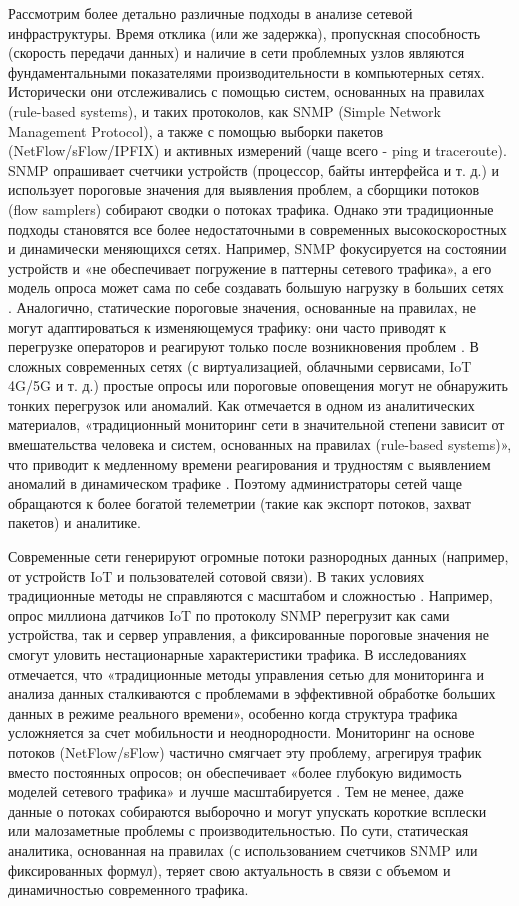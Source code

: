 Рассмотрим более детально различные подходы в анализе сетевой инфраструктуры. Время отклика (или же задержка), пропускная способность (скорость передачи данных) и наличие в сети проблемных узлов являются фундаментальными показателями производительности в компьютерных сетях. Исторически они отслеживались с помощью систем, основанных на правилах (rule-based systems), и таких протоколов, как SNMP (Simple Network Management Protocol), а также с помощью выборки пакетов (NetFlow/sFlow/IPFIX) и активных измерений (чаще всего - ping и traceroute). SNMP опрашивает счетчики устройств (процессор, байты интерфейса и т. д.) и использует пороговые значения для выявления проблем, а сборщики потоков (flow samplers) собирают сводки о потоках трафика. Однако эти традиционные подходы становятся все более недостаточными в современных высокоскоростных и динамически меняющихся сетях. Например, SNMP фокусируется на состоянии устройств и «не обеспечивает погружение в паттерны сетевого трафика», а его модель опроса может сама по себе создавать большую нагрузку в больших сетях \cite{snmp1}. Аналогично, статические пороговые значения, основанные на правилах, не могут адаптироваться к изменяющемуся трафику: они часто приводят к перегрузке операторов и реагируют только после возникновения проблем \cite{mlmon1}. В сложных современных сетях (с виртуализацией, облачными сервисами, IoT 4G/5G и т. д.) простые опросы или пороговые оповещения могут не обнаружить тонких перегрузок или аномалий. Как отмечается в одном из аналитических материалов, «традиционный мониторинг сети в значительной степени зависит от вмешательства человека и систем, основанных на правилах (rule-based systems)», что приводит к медленному времени реагирования и трудностям с выявлением аномалий в динамическом трафике \cite{mlmon1}. Поэтому администраторы сетей  чаще обращаются к более богатой телеметрии (такие как экспорт потоков, захват пакетов) и аналитике.


Современные сети генерируют огромные потоки разнородных данных (например, от устройств IoT и пользователей сотовой связи). В таких условиях традиционные методы не справляются с масштабом и сложностью \cite{Abbasi2021}. Например, опрос миллиона датчиков IoT по протоколу SNMP перегрузит как сами устройства, так и сервер управления, а фиксированные пороговые значения не смогут уловить нестационарные характеристики трафика. В исследованиях отмечается, что «традиционные методы управления сетью для мониторинга и анализа данных сталкиваются с проблемами в эффективной обработке больших данных в режиме реального времени», особенно когда структура трафика усложняется за счет мобильности и неоднородности. Мониторинг на основе потоков (NetFlow/sFlow) частично смягчает эту проблему, агрегируя трафик вместо постоянных опросов; он обеспечивает «более глубокую видимость моделей сетевого трафика» и лучше масштабируется \cite{snmp1}. Тем не менее, даже данные о потоках собираются выборочно и могут упускать короткие всплески или малозаметные проблемы с производительностью. По сути, статическая аналитика, основанная на правилах (с использованием счетчиков SNMP или фиксированных формул), теряет свою актуальность в связи с объемом и динамичностью современного трафика.

